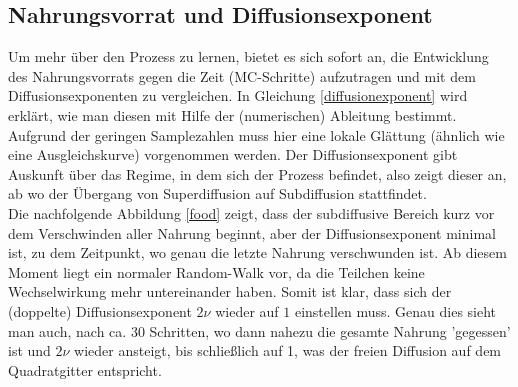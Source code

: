 \documentclass[a4paper, 12pt]{report}
\begin{document}
\subsection{Nahrungsvorrat und Diffusionsexponent}
Um mehr über den Prozess zu lernen, bietet es sich sofort an, die Entwicklung des Nahrungsvorrats gegen die Zeit (MC-Schritte) aufzutragen und mit dem Diffusionsexponenten zu vergleichen. In Gleichung \ref{diffusionexponent} wird erklärt, wie man diesen mit Hilfe der (numerischen) Ableitung bestimmt. Aufgrund der geringen Samplezahlen muss hier eine lokale Glättung (ähnlich wie eine Ausgleichskurve) vorgenommen werden. Der Diffusionsexponent gibt Auskunft über das Regime, in dem sich der Prozess befindet, also zeigt dieser an, ab wo der Übergang von Superdiffusion auf Subdiffusion stattfindet.
\\
\noindent Die nachfolgende Abbildung \ref{food} zeigt, dass der subdiffusive Bereich kurz vor dem Verschwinden aller Nahrung beginnt, aber der Diffusionsexponent minimal ist, zu dem Zeitpunkt, wo genau die letzte Nahrung verschwunden ist. Ab diesem Moment liegt ein normaler Random-Walk vor, da die Teilchen keine Wechselwirkung mehr untereinander haben. Somit ist klar, dass sich der (doppelte) Diffusionsexponent $2\nu$ wieder auf $1$ einstellen muss. Genau dies sieht man auch, nach ca. 30 Schritten, wo dann nahezu die gesamte Nahrung 'gegessen' ist und $2\nu$ wieder ansteigt, bis schließlich auf 1, was der freien Diffusion auf dem Quadratgitter entspricht.
\end{document}
